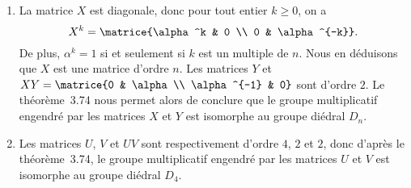 
\begin{enumerate}
  \item %
    La matrice $X$ est diagonale, donc pour tout entier $k\geq 0$, on a
    \[
      X^k = \matrice{\alpha^k  & 0 \\ 0 & \alpha^{-k}}.
    \]
    De plus, $\alpha^k = 1$ si et seulement si $k$ est un multiple de $n$.
    Nous en déduisons que $X$ est une matrice d'ordre $n$.
    Les matrices $Y$ et $XY = \matrice{0 & \alpha \\ \alpha^{-1} & 0}$ sont d'ordre $2$.
    Le théorème~3.74 nous permet alors de conclure que le groupe multiplicatif engendré par les matrices $X$ et $Y$ est isomorphe au groupe diédral $D_n$.

  \item %
    Les matrices $U$, $V$ et $UV$ sont respectivement d'ordre $4$, $2$ et $2$, donc d'après le théorème~3.74, le groupe multiplicatif engendré par les matrices $U$ et $V$ est isomorphe au groupe diédral $D_4$.
\end{enumerate}

